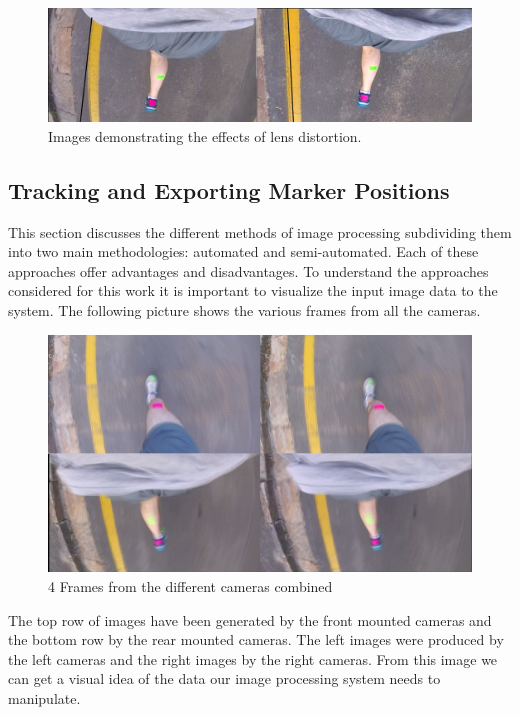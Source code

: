 \begin{figure}[!ht]
\captionsetup{width=0.8\linewidth, font=small} 
\includegraphics[width=\linewidth]{figures/fixed.jpg}
\caption{Images demonstrating the effects of lens distortion.}
\label{fig:fixed}
\end{figure}


\subsection{Tracking and Exporting Marker Positions}
This section discusses the different methods of image processing subdividing them into two main methodologies: automated and semi-automated. Each of these approaches offer advantages and disadvantages. To understand the approaches considered for this work it is important to visualize the input image data to the system. The following picture shows the various frames from all the cameras.

\begin{figure}[!ht]
\captionsetup{width=0.8\linewidth, font=small} 
\includegraphics[width=\linewidth]{figures/pat_run_quad.png}
\caption{4 Frames from the different cameras combined}
\label{fig:pat_run_quad}
\end{figure}

The top row of images have been generated by the front mounted cameras and the bottom row by the rear mounted cameras. The left images were produced by the left cameras and the right images by the right cameras. From this image we can get a visual idea of the data our image processing system needs to manipulate.

